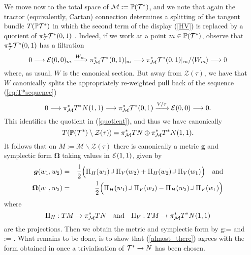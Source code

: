 We move now to the total space of $\mathcal{M}:=\mathbb{P}( {\mathcal{T}^*})$, and we note that again the tractor (equivalently, Cartan) connection determines a splitting of the tangent bundle $T(\mathbb{P} {\mathcal{T}^*})$ in which the second term of the display (\ref{HV}) is replaced by a quotient of $\pi_{\mathcal{T}}^* \mathcal{T}^*(0,1)$ \cite{CGH-duke}. Indeed, if we work at a point $m\in \mathbb{P}(\mathcal{T}^*)$, observe that $\pi_{\mathcal{T}}^*\mathcal{T}^*(0,1)$ has a filtration
\begin{equation}\label{quotient}
0\longrightarrow \mathcal{E} (0,0)_m\xrightarrow{W_m}  \pi_{\mathcal{M}}^* \mathcal{T}^*(0,1)|_m \longrightarrow  \pi_{\mathcal{M}}^* \mathcal{T}^*(0,1)|_m/\langle W_m \rangle \longrightarrow 0
\end{equation}
where, as usual, $W$ is the canonical section. 
But away from $\mathcal{Z}(\tau )$, we have that  $W$ canonically splits 
the appropriately re-weighted pull back of  the sequence (\ref{eq:T*sequence})
$$
0\longrightarrow \pi_{\mathcal{M}}^* T^*N(1,1)   \longrightarrow \pi_{\mathcal{M}}^* \mathcal{T}^*(0,1) \xrightarrow{V/\tau} \mathcal{E}(0,0) \longrightarrow 0 .
$$
This identifies the quotient in (\ref{quotient}), and thus we have canonically
$$
T(\mathbb{P}(\mathcal{T}^*)\setminus \mathcal{Z}(\tau))=  \pi_{\mathcal{M}}^*TN\oplus \pi_{\mathcal{M}}^*T^*N(1,1).
$$
It follows that on  $M:=\mathcal{M}\backslash\mathcal{Z}(\tau)$
there is canonically a metric $\boldsymbol{g}$ and symplectic form $\boldsymbol{\Omega}$ taking values in $\mathcal{E}(1,1)$, given by
\begin{eqnarray*}
\boldsymbol{g}(w_1,w_2)&=& \frac{1}{2}\Big(
\pp_H(w_1)\hook \pp_V(w_2)+\pp_H(w_2)\hook\pp_V(w_1)\Big) \quad \mbox{and} \\
\boldsymbol{\Omega}(w_1,w_2)&=& \frac{1}{2}\Big(\pp_H(w_1)\hook \pp_V(w_2)-\pp_H(w_2)\hook\pp_V(w_1)\Big)
\end{eqnarray*}
where
$$
\mbox{$\scriptsize{\Pi}$}_H: TM\to \pi_{\mathcal{M}}^*TN \quad \mbox{and} \quad \mbox{$\scriptsize{\Pi}$}_V: TM\to \pi_{\mathcal{M}}^* T^*N(1,1)
$$
are the projections.
Then we obtain the metric and symplectic form by
\be
\label{almost_there}
g:= \qquad \mbox{and} \qquad \Omega:=\boldsymbol{\Omega} .
\ee
What remains to be done, is to show that (\ref{almost_there}) agrees
with the form obtained in \cite{DM} once a trivialisation of
$\mathcal{T}^*\rightarrow N$ has been chosen.

